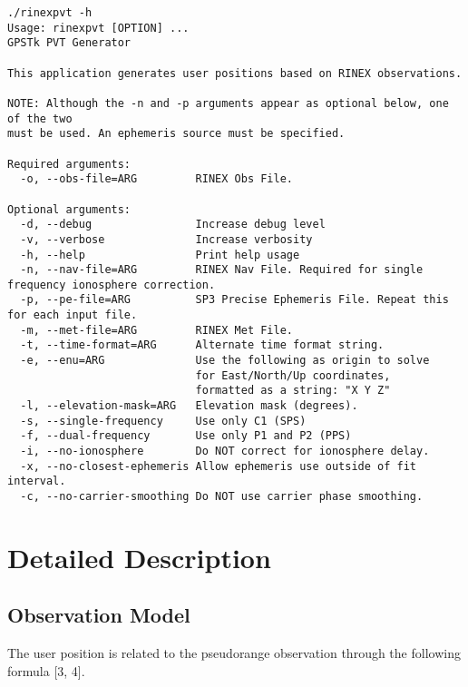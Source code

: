 \small
\begin{singlespace}
\begin{verbatim}
./rinexpvt -h
Usage: rinexpvt [OPTION] ...
GPSTk PVT Generator

This application generates user positions based on RINEX observations.

NOTE: Although the -n and -p arguments appear as optional below, one of the two
must be used. An ephemeris source must be specified.

Required arguments:
  -o, --obs-file=ARG         RINEX Obs File.

Optional arguments:
  -d, --debug                Increase debug level
  -v, --verbose              Increase verbosity
  -h, --help                 Print help usage
  -n, --nav-file=ARG         RINEX Nav File. Required for single frequency ionosphere correction.
  -p, --pe-file=ARG          SP3 Precise Ephemeris File. Repeat this for each input file.
  -m, --met-file=ARG         RINEX Met File.
  -t, --time-format=ARG      Alternate time format string.
  -e, --enu=ARG              Use the following as origin to solve 
                             for East/North/Up coordinates, 
                             formatted as a string: "X Y Z"
  -l, --elevation-mask=ARG   Elevation mask (degrees).
  -s, --single-frequency     Use only C1 (SPS)
  -f, --dual-frequency       Use only P1 and P2 (PPS)
  -i, --no-ionosphere        Do NOT correct for ionosphere delay.
  -x, --no-closest-ephemeris Allow ephemeris use outside of fit interval.
  -c, --no-carrier-smoothing Do NOT use carrier phase smoothing.
\end{verbatim}
\end{singlespace}
\normalsize

\section{Detailed Description}

\subsection{Observation Model}

The user position is related to the pseudorange observation through the
following formula [3, 4].


